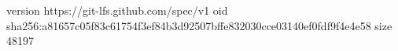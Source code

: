 version https://git-lfs.github.com/spec/v1
oid sha256:a81657c05f83c61754f3ef84b3d92507bffe832030cce03140ef0fdf9f4e4e58
size 48197
